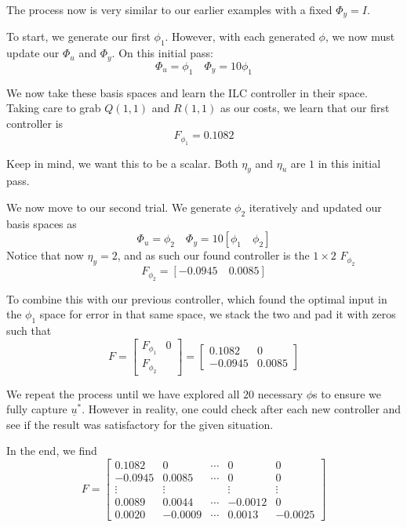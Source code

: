 The process now is very similar to our earlier examples with a fixed $\Phi_y = I$.

To start, we generate our first $\phi_1$. However, with each generated $\phi$, we now must update our $\Phi_u$ and $\Phi_y$. On this initial pass:
\begin{equation}
    \Phi_u = \phi_1 \quad \Phi_y = 10\phi_1
\end{equation}

We now take these basis spaces and learn the ILC controller in their space. Taking care to grab $Q(1, 1)$ and $R(1, 1)$ as our costs, we learn that our first controller is
\begin{equation}
    F_{\phi_1} = 0.1082
\end{equation}

Keep in mind, we want this to be a scalar. Both $\eta_y$ and $\eta_u$ are $1$ in this initial pass. 

We now move to our second trial. We generate $\phi_2$ iteratively and updated our basis spaces as
\begin{equation}
    \Phi_u = \phi_2 \quad \Phi_y = 10\left[\phi_1\quad \phi_2\right]
\end{equation}
Notice that now $\eta_y =2$, and as such our found controller is the $1 \times 2$ $F_{\phi_2}$
\begin{equation}
    F_{\phi_2} = \left[-0.0945  \quad   0.0085\right]
\end{equation}

To combine this with our previous controller, which found the optimal input in the $\phi_1$ space for error in that same space, we stack the two and pad it with zeros such that
\begin{equation}
    F =
    \begin{bmatrix}
        F_{\phi_1} & 0 \\
        F_{\phi_2}
    \end{bmatrix}
    = 
    \begin{bmatrix}
        0.1082 & 0 \\
        -0.0945 & 0.0085
    \end{bmatrix}
\end{equation}

We repeat the process until we have explored all $20$ necessary $\phi$s to ensure we fully capture $\underline{u}^\ast$. However in reality, one could check after each new controller and see if the result was satisfactory for the given situation.

In the end, we find
\begin{equation}
    F = 
    \begin{bmatrix}
        0.1082   &      0  &  \cdots   &  0   &      0 \\
        -0.0945 &   0.0085   &  \cdots   &      0    &     0 \\
        \vdots & \vdots & & \vdots & \vdots \\
         0.0089 &   0.0044 &  \cdots   &  -0.0012   &      0 \\
         0.0020  & -0.0009  &  \cdots   &  0.0013 &  -0.0025
    \end{bmatrix}
\end{equation}

